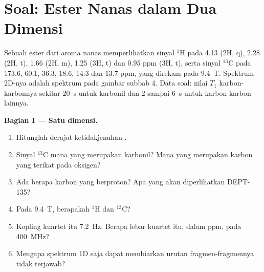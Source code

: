 \section{Soal: Ester Nanas dalam Dua Dimensi}

\begin{problem}
\label{pb:b3:advanced-nmr:1}
Sebuah ester  dari aroma nanas memperlihatkan sinyal ${}^1$H pada
4.13 (2H, q), 2.28 (2H, t), 1.66 (2H, m), 1.25 (3H, t) dan 0.95 ppm (3H, t), serta
sinyal ${}^{13}$C pada 173.6, 60.1, 36.3, 18.6, 14.3 dan 13.7 ppm, yang direkam
pada \qty{9.4}{T}. Spektrum 2D-nya adalah spektrum pada gambar subbab 4. Data
soal: nilai $T_1$ karbon-karbonnya sekitar \qty{20}{s} untuk karbonil dan 2
sampai \qty{6}{s} untuk karbon-karbon lainnya.

\medskip\noindent\textbf{Bagian I --- Satu dimensi.}
\begin{enumerate}[beginpenalty=10000]
  \item Hitunglah derajat ketidakjenuhan .
  \item Sinyal ${}^{13}$C mana yang merupakan karbonil? Mana yang merupakan
        karbon yang terikat pada oksigen?
  \item Ada berapa karbon yang berproton? Apa yang akan diperlihatkan DEPT-135?
  \item Pada \qty{9.4}{T}, berapakah  ${}^1$H dan ${}^{13}$C?
  \item Kopling kuartet itu \qty{7.2}{Hz}. Berapa lebar kuartet itu, dalam
        ppm, pada \qty{400}{MHz}?
  \item Mengapa spektrum 1D saja dapat membiarkan urutan fragmen-fragmennya
        tidak terjawab?
\end{enumerate}


\end{problem}
